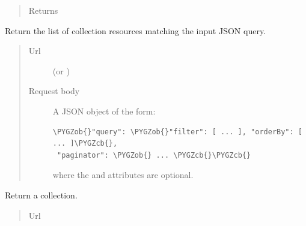 \documentclass[letterpaper,10pt,english]{sphinxmanual}
\def\PYGZob{\char`\{}
\def\PYGZcb{\char`\}}
\begin{document}
\begin{fulllineitems}
\begin{fulllineitems}
\begin{quote}
\begin{description}
\item[{Returns}] \leavevmode
{}

\end{description}\end{quote}

\end{fulllineitems}


\begin{fulllineitems}
\label{api:onlinelinguisticdatabase.controllers.oldcollections.OldcollectionsController.search}
Return the list of collection resources matching the input JSON query.
\begin{quote}\begin{description}
\item[{Url }] \leavevmode
{} (or )

\item[{Request body}] \leavevmode
A JSON object of the form:

\begin{Verbatim}[commandchars=\\\{\}]
\PYGZob{}"query": \PYGZob{}"filter": [ ... ], "orderBy": [ ... ]\PYGZcb{},
 "paginator": \PYGZob{} ... \PYGZcb{}\PYGZcb{}
\end{Verbatim}

where the  and  attributes are optional.

\end{description}\end{quote}

\end{fulllineitems}


\begin{fulllineitems}
\label{api:onlinelinguisticdatabase.controllers.oldcollections.OldcollectionsController.show}
Return a collection.
\begin{quote}\begin{description}
\item[{Url }] \leavevmode
{}


\end{description}
\end{quote}
\end{fulllineitems}
\end{fulllineitems}
\end{document}
